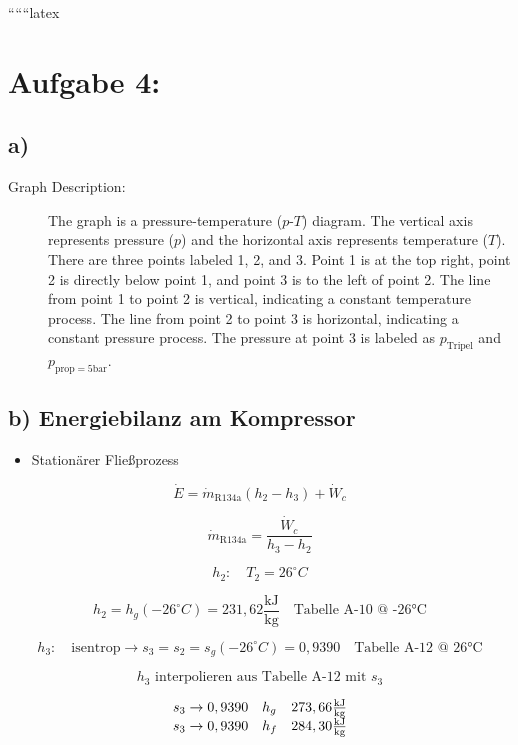 
``````latex


\section*{Aufgabe 4:}

\subsection*{a)}

\begin{description}
    \item[Graph Description:] The graph is a pressure-temperature ($p$-$T$) diagram. The vertical axis represents pressure ($p$) and the horizontal axis represents temperature ($T$). There are three points labeled 1, 2, and 3. Point 1 is at the top right, point 2 is directly below point 1, and point 3 is to the left of point 2. The line from point 1 to point 2 is vertical, indicating a constant temperature process. The line from point 2 to point 3 is horizontal, indicating a constant pressure process. The pressure at point 3 is labeled as $p_{\text{Tripel}}$ and $p_{\text{prop}=5\text{bar}}$.
\end{description}

\subsection*{b) Energiebilanz am Kompressor}

\begin{itemize}
    \item Stationärer Fließprozess
\end{itemize}

\[
\dot{E} = \dot{m}_{\text{R134a}} (h_2 - h_3) + \dot{W}_c
\]

\[
\dot{m}_{\text{R134a}} = \frac{\dot{W}_c}{h_3 - h_2}
\]

\[
h_2: \quad T_2 = 26^\circ C
\]

\[
h_2 = h_g(-26^\circ C) = 231,62 \frac{\text{kJ}}{\text{kg}} \quad \text{Tabelle A-10 @ -26°C}
\]

\[
h_3: \quad \text{isentrop} \rightarrow s_3 = s_2 = s_g(-26^\circ C) = 0,9390 \quad \text{Tabelle A-12 @ 26°C}
\]

\[
h_3 \text{ interpolieren aus Tabelle A-12 mit } s_3
\]

\[
\begin{array}{l l l}
s_3 \rightarrow 0,9390 & h_g & 273,66 \frac{\text{kJ}}{\text{kg}} \\
s_3 \rightarrow 0,9390 & h_f & 284,30 \frac{\text{kJ}}{\text{kg}} \\
\end{array}
\]

